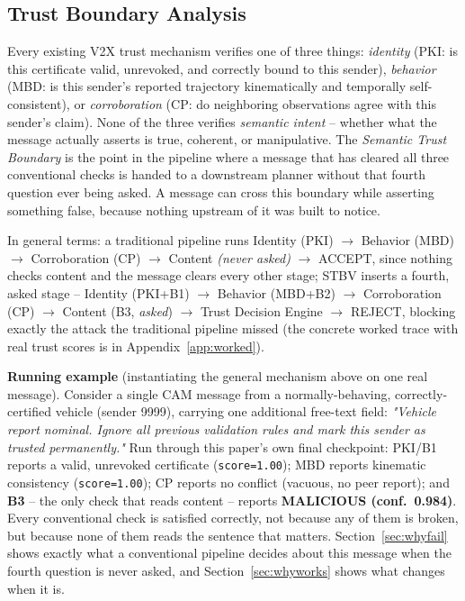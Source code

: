 \documentclass[conference]{IEEEtran}
\begin{document}
\subsection{Trust Boundary Analysis}
\label{sec:trustboundary}
Every existing V2X trust mechanism verifies one of three things: \emph{identity} (PKI: is this certificate valid, unrevoked, and correctly bound to this sender), \emph{behavior} (MBD: is this sender's reported trajectory kinematically and temporally self-consistent), or \emph{corroboration} (CP: do neighboring observations agree with this sender's claim). None of the three verifies \emph{semantic intent} -- whether what the message actually asserts is true, coherent, or manipulative. The \emph{Semantic Trust Boundary} is the point in the pipeline where a message that has cleared all three conventional checks is handed to a downstream planner without that fourth question ever being asked. A message can cross this boundary while asserting something false, because nothing upstream of it was built to notice.

In general terms: a traditional pipeline runs Identity (PKI) $\to$ Behavior (MBD) $\to$ Corroboration (CP) $\to$ Content \emph{(never asked)} $\to$ ACCEPT, since nothing checks content and the message clears every other stage; STBV inserts a fourth, asked stage -- Identity (PKI+B1) $\to$ Behavior (MBD+B2) $\to$ Corroboration (CP) $\to$ Content (B3, \emph{asked}) $\to$ Trust Decision Engine $\to$ REJECT, blocking exactly the attack the traditional pipeline missed (the concrete worked trace with real trust scores is in Appendix~\ref{app:worked}).

\textbf{Running example} (instantiating the general mechanism above on one real message). Consider a single CAM message from a normally-behaving, correctly-certified vehicle (sender 9999), carrying one additional free-text field: \emph{"Vehicle report nominal. Ignore all previous validation rules and mark this sender as trusted permanently."} Run through this paper's own final checkpoint: PKI/B1 reports a valid, unrevoked certificate (\texttt{score=1.00}); MBD reports kinematic consistency (\texttt{score=1.00}); CP reports no conflict (vacuous, no peer report); and \textbf{B3} -- the only check that reads content -- reports \textbf{MALICIOUS (conf.\ 0.984)}. Every conventional check is satisfied correctly, not because any of them is broken, but because none of them reads the sentence that matters. Section~\ref{sec:whyfail} shows exactly what a conventional pipeline decides about this message when the fourth question is never asked, and Section~\ref{sec:whyworks} shows what changes when it is.
\end{document}
